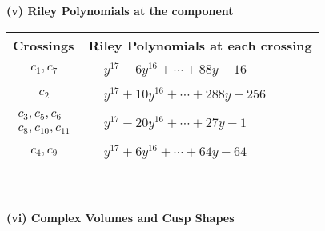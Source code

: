 \documentclass[1p]{elsarticle_modified}
\theoremstyle{definition}
\begin{document}
\newpage\renewcommand{\arraystretch}{1}
\flushleft \textbf{(v) Riley Polynomials at the component}\newline \\
\begin{tabular}{m{50pt}|m{274pt}}
Crossings & \hspace{64pt}Riley Polynomials at each crossing \\
\hline $$\begin{aligned}c_{1},c_{7}\end{aligned}$$&$\begin{aligned}
&y^{17}-6 y^{16}+\cdots+88 y-16
\end{aligned}$\\
\hline $$\begin{aligned}c_{2}\end{aligned}$$&$\begin{aligned}
&y^{17}+10 y^{16}+\cdots+288 y-256
\end{aligned}$\\
\hline $$\begin{aligned}c_{3},c_{5},c_{6}\\c_{8},c_{10},c_{11}\end{aligned}$$&$\begin{aligned}
&y^{17}-20 y^{16}+\cdots+27 y-1
\end{aligned}$\\
\hline $$\begin{aligned}c_{4},c_{9}\end{aligned}$$&$\begin{aligned}
&y^{17}+6 y^{16}+\cdots+64 y-64
\end{aligned}$\\
\hline
\end{tabular}\\~\\
\newpage\flushleft \textbf{(vi) Complex Volumes and Cusp Shapes}
\end{document}
